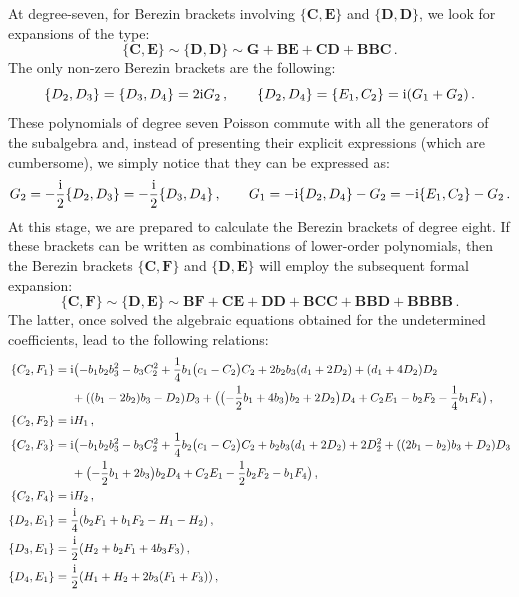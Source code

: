 \documentclass[10pt]{amsart}
\theoremstyle{definition}
\theoremstyle{corollary}
\theoremstyle{remark}
\theoremstyle{conclusion}
\begin{document}
At degree-seven, for Berezin brackets involving $\{\mathbf{C},\mathbf{E}\}$ and $\{\mathbf{D},\mathbf{D}\}$, we look for expansions of the type:
\begin{equation}
\{\mathbf{C},\mathbf{E}\} \sim \{\mathbf{D},\mathbf{D}\}  \sim \mathbf{G}+\mathbf{B}\mathbf{E}+\mathbf{C}\mathbf{D}+\mathbf{B}\mathbf{B}\mathbf{C} \, .
\label{deg7}
\end{equation}
The only non-zero Berezin brackets are the following:
\begin{equation}
\{D_2, D_3\}=\{D_3, D_4\}=2{\rm i}G_2 \, , \qquad \{D_2, D_4\}=\{E_1, C_2\}={\rm i}(G_1+G_2) \, .
\end{equation}
These polynomials of degree seven Poisson commute with all the generators of the subalgebra and, instead of presenting their explicit expressions (which are cumbersome), we simply notice that they can be expressed as:
 \begin{equation}
G_2=-\frac{{\rm i}}{2} \{D_2, D_3\}=-\frac{{\rm i}}{2}\{D_3, D_4\} \, , \qquad G_1 =-{\rm i}\{D_2, D_4\}-G_2=-{\rm i}\{E_1, C_2\}-G_2\, .
 \end{equation}
At this stage, we are prepared to calculate the Berezin brackets of degree eight. If these brackets can be written as combinations of lower-order polynomials, then the Berezin brackets $\{\mathbf{C}, \mathbf{F}\}$ and $\{\mathbf{D}, \mathbf{E}\}$ will employ the subsequent formal expansion:
\begin{equation}
\{\mathbf{C}, \mathbf{F}\} \sim \{\mathbf{D}, \mathbf{E}\}\sim  \mathbf{B}\mathbf{F}+\mathbf{C}\mathbf{E}+\mathbf{D}\mathbf{D}+\mathbf{B}\mathbf{C}\mathbf{C}+\mathbf{B}\mathbf{B}\mathbf{D}+\mathbf{B}\mathbf{B}\mathbf{B}\mathbf{B} \,  .
\label{deg8}
\end{equation}
The latter, once solved the algebraic equations obtained for the undetermined coefficients, lead to the following relations:
\begin{align}
\{C_2, F_{1}\}&= {\rm i}\bigl(-b_1 b_2 b_3^2-b_3 C_2^2+\frac{1}{4}b_1 \bigl(c_1-C_2\bigl)C_2+2 b_2 b_3(d_1+2D_2)+(d_1+4 D_2)D_2 \nonumber \\
&\hskip 0.5cm+((b_1-2 b_2)b_3-D_2)D_3+\bigl(\bigl(-\frac{1}{2}b_1+4 b_3\bigl)b_2+2D_2\bigl)D_4+C_2 E_1-b_2 F_2-\frac{1}{4}b_1 F_4\bigl) \, ,\nonumber  \\
\{C_2, F_{2}\}&= {\rm i} H_1  \, ,\nonumber \\
\{C_2, F_{3}\}&=   {\rm i}\bigl(-b_1 b_2 b_3^2-b_3 C_2^2+\frac{1}{4}b_2 \bigl(c_1-C_2\bigl)C_2+ b_2 b_3(d_1+2D_2)+2D_2^2+((2b_1- b_2)b_3+D_2)D_3 \nonumber \\
&\hskip 0.5cm+\bigl(-\frac{1}{2}b_1+2 b_3\bigl)b_2D_4+C_2 E_1-\frac{1}{2}b_2 F_2-b_1 F_4\bigl)\, ,\nonumber \\
\{C_2, F_{4}\}&={\rm i} H_2   \, , \nonumber  \\
\{D_2, E_{1}\}&=\frac{{\rm i}}{4}(b_2 F_1+b_1 F_2-H_1-H_2)  \, , \nonumber \\
\{D_3, E_{1}\}&=\frac{{\rm i}}{2}(H_2+b_2 F_1+4 b_3 F_3) \, , \nonumber \\
\{D_4, E_{1}\}&=\frac{{\rm i}}{2}(H_1+H_2+2 b_3(F_1+F_3)) \, ,
\end{align}
\end{document}
